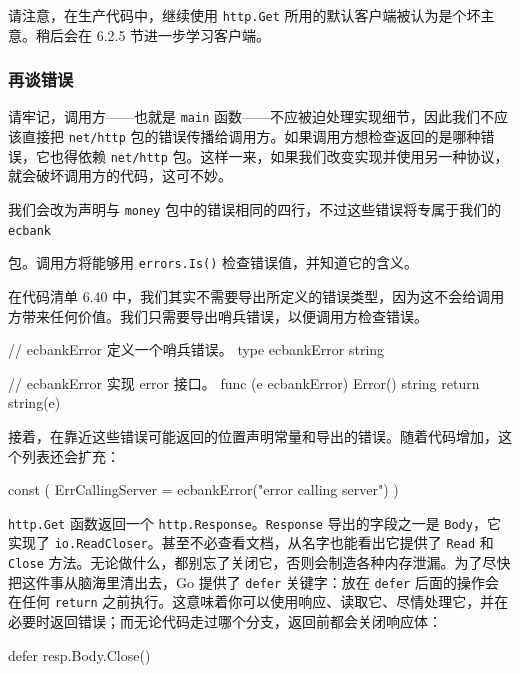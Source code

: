 请注意，在生产代码中，继续使用 \texttt{http.Get} 所用的默认客户端被认为是个坏主意。稍后会在 6.2.5 节进一步学习客户端。

\subsubsection*{再谈错误}

请牢记，调用方——也就是 \texttt{main} 函数——不应被迫处理实现细节，因此我们不应该直接把 \texttt{net/http} 包的错误传播给调用方。如果调用方想检查返回的是哪种错误，它也得依赖 \texttt{net/http} 包。这样一来，如果我们改变实现并使用另一种协议，就会破坏调用方的代码，这可不妙。

我们会改为声明与 \texttt{money} 包中的错误相同的四行，不过这些错误将专属于我们的 \texttt{ecbank}

包。调用方将能够用 \texttt{errors.Is()} 检查错误值，并知道它的含义。

在代码清单 6.40 中，我们其实不需要导出所定义的错误类型，因为这不会给调用方带来任何价值。我们只需要导出哨兵错误，以便调用方检查错误。

\begin{gocode}[title={代码清单 6.40 \texttt{errors.go}：可能的错误}]
// ecbankError 定义一个哨兵错误。
type ecbankError string

// ecbankError 实现 error 接口。
func (e ecbankError) Error() string {
    return string(e)
}
\end{gocode}

接着，在靠近这些错误可能返回的位置声明常量和导出的错误。随着代码增加，这个列表还会扩充：

\begin{gocode}[]
const (
    ErrCallingServer = ecbankError("error calling server")
)
\end{gocode}

\texttt{http.Get} 函数返回一个 \texttt{http.Response}。\texttt{Response} 导出的字段之一是 \texttt{Body}，它实现了 \texttt{io.ReadCloser}。甚至不必查看文档，从名字也能看出它提供了 \texttt{Read} 和 \texttt{Close} 方法。无论做什么，都别忘了关闭它，否则会制造各种内存泄漏。为了尽快把这件事从脑海里清出去，Go 提供了 \texttt{defer} 关键字：放在 \texttt{defer} 后面的操作会在任何 \texttt{return} 之前执行。这意味着你可以使用响应、读取它、尽情处理它，并在必要时返回错误；而无论代码走过哪个分支，返回前都会关闭响应体：

\begin{gocode}[]
defer resp.Body.Close()
\end{gocode}

